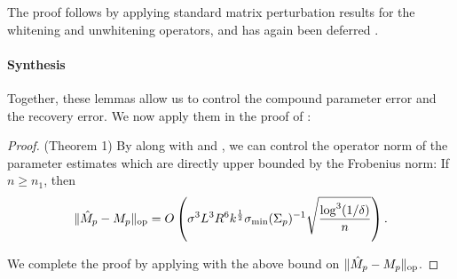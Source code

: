 The proof follows by applying standard matrix perturbation results for
the whitening and unwhitening operators, and has again been deferred
. 

\paragraph{Synthesis}
Together, these lemmas allow us to control the compound parameter error
and the recovery error. We now apply them in the proof of
:

\begin{proof}(Theorem 1)
By  along with  and
, we can control the operator norm of the parameter
estimates which are directly upper bounded by the Frobenius norm: If $n
\ge n_1$, then
\begin{align}
  \|\hat M_p - M_p\|_{\text{op}} = O\left( \sigma^3 L^3 R^6 k^{\frac12} \sigma_\text{\rm min}(\Sigma_p)^{-1} \sqrt{\frac{\log^3 (1/\delta)}{n}} \right).
\end{align}

We complete the proof by applying  with the above
bound on $\|\hat M_p - M_p\|_{\text{op}}$.

\end{proof}

